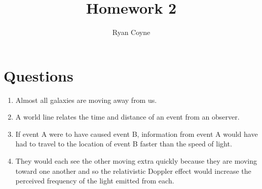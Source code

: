 \documentclass[12pt]{article}
\begin{document}
    \title{Homework 2}
    \author{Ryan Coyne}
    \maketitle
    \section{Questions}
    \begin{enumerate}
        \item Almost all galaxies are moving away from us.
        \item A world line relates the time and distance of an event from an observer.
        \item If event A were to have caused event B, information from event A would have had to travel to the location of event B faster than the speed of light.
        \item They would each see the other moving extra quickly because they are moving toward one another and so the relativistic Doppler effect would increase the perceived frequency of the light emitted from each.
    \end{enumerate}
\end{document}
